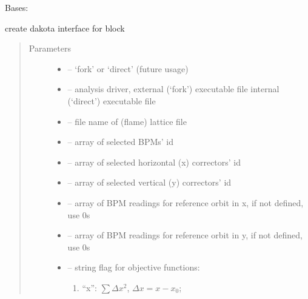 \documentclass[letterpaper,10pt,english]{sphinxmanual}
\begin{document}
\begin{fulllineitems}
\label{\detokenize{src/apidocs/genopt:genopt.DakotaInterface}}
Bases: \href{https://docs.python.org/2/library/functions.html\#object}{}

create dakota interface for  block
\begin{quote}\begin{description}
\item[{Parameters}] \leavevmode\begin{itemize}
\item {} 
 -- `fork' or `direct' (future usage)

\item {} 
 -- analysis driver, external (`fork') executable file
internal (`direct') executable file

\item {} 
 -- file name of (flame) lattice file

\item {} 
 -- array of selected BPMs' id

\item {} 
 -- array of selected horizontal (x) correctors' id

\item {} 
 -- array of selected vertical (y) correctors' id

\item {} 
 -- array of BPM readings for reference orbit in x, if not defined, use 0s

\item {} 
 -- array of BPM readings for reference orbit in y, if not defined, use 0s

\item {} 
 -- 
string flag for objective functions:
\begin{enumerate}
\item {} 
``x'': \(\sum \Delta x^2\), \(\Delta x = x-x_0\);


\end{enumerate}
\end{itemize}
\end{description}
\end{quote}
\end{fulllineitems}
\end{document}
